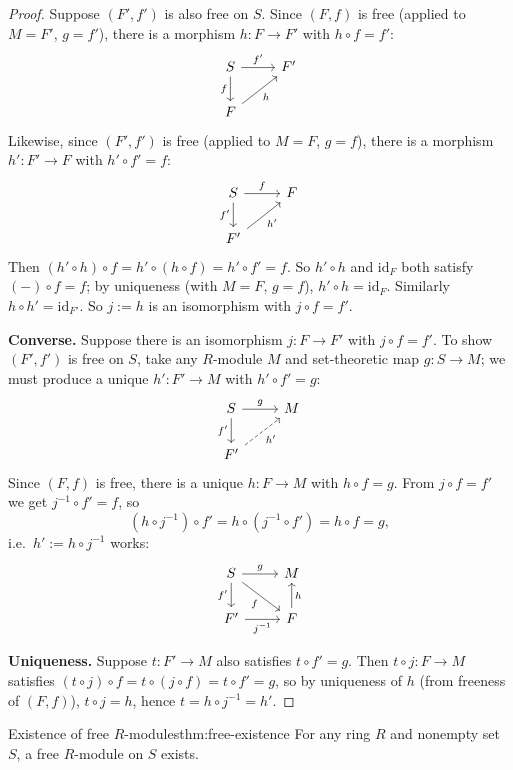 \begin{proof}
Suppose $(F', f')$ is also free on $S$. Since $(F, f)$ is free (applied to $M = F'$, $g = f'$), there is a morphism $h: F \to F'$ with $h \circ f = f'$:
\[
\begin{tikzcd}
S \arrow[r, "f'"] \arrow[d, "f"'] & F' \\
F \arrow[ur, "h"'] &
\end{tikzcd}
\]
Likewise, since $(F', f')$ is free (applied to $M = F$, $g = f$), there is a morphism $h': F' \to F$ with $h' \circ f' = f$:
\[
\begin{tikzcd}
S \arrow[r, "f"] \arrow[d, "f'"'] & F \\
F' \arrow[ur, "h'"'] &
\end{tikzcd}
\]
Then $(h' \circ h) \circ f = h' \circ (h \circ f) = h' \circ f' = f$. So $h' \circ h$ and $\mathrm{id}_F$ both satisfy $(-) \circ f = f$; by uniqueness (with $M = F$, $g = f$), $h' \circ h = \mathrm{id}_F$. Similarly $h \circ h' = \mathrm{id}_{F'}$. So $j := h$ is an isomorphism with $j \circ f = f'$.

\textbf{Converse.} Suppose there is an isomorphism $j: F \to F'$ with $j \circ f = f'$. To show $(F', f')$ is free on $S$, take any $R$-module $M$ and set-theoretic map $g: S \to M$; we must produce a unique $h': F' \to M$ with $h' \circ f' = g$:
\[
\begin{tikzcd}
S \arrow[r, "g"] \arrow[d, "f'"'] & M \\
F' \arrow[ur, dashed, "h'"'] &
\end{tikzcd}
\]
Since $(F,f)$ is free, there is a unique $h: F \to M$ with $h \circ f = g$. From $j \circ f = f'$ we get $j^{-1} \circ f' = f$, so
\[
(h \circ j^{-1}) \circ f' = h \circ (j^{-1} \circ f') = h \circ f = g,
\]
i.e.\ $h' := h \circ j^{-1}$ works:
\[
\begin{tikzcd}
S \arrow[r, "g"] \arrow[d, "f'"'] \arrow[dr, "f"'] & M \\
F' \arrow[r, "j^{-1}"'] & F \arrow[u, "h"']
\end{tikzcd}
\]

\textbf{Uniqueness.} Suppose $t: F' \to M$ also satisfies $t \circ f' = g$. Then $t \circ j: F \to M$ satisfies $(t \circ j) \circ f = t \circ (j \circ f) = t \circ f' = g$, so by uniqueness of $h$ (from freeness of $(F,f)$), $t \circ j = h$, hence $t = h \circ j^{-1} = h'$.
\end{proof}

\begin{theorem}{Existence of free $R$-modules}{thm:free-existence}
For any ring $R$ and nonempty set $S$, a free $R$-module on $S$ exists.
\end{theorem}

